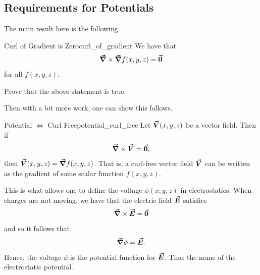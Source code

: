                    	        \subsection{Requirements for Potentials}
                   	        
                   	        The main result here is the following.
                   	        
                   	        \begin{prop}{Curl of Gradient is Zero}{curl_of_gradient}
                   	        We have that
                   	        \[
                   	        \boldsymbol{\vec{\nabla}} \times \boldsymbol{\vec{\nabla}} f(x,y,z) = \boldsymbol{\vec{0}}
                   	        \]
                   	        for all $f(x,y,z)$.
                   	        \end{prop}
                   	        
                   	        \begin{exercise}
                   	        	Prove that the above statement is true.
                   	        \end{exercise}
                   	        
                   	        Then with a bit more work, one can show this follows.
                   	        
                   	        \begin{thm}{Potential $\iff$ Curl Free}{potential_curl_free}
                   	        Let $\boldsymbol{\vec{V}}(x,y,z)$ be a vector field.  Then if 
                   	        \[
                   	        \boldsymbol{\vec{\nabla}} \times \boldsymbol{\vec{V}} = \boldsymbol{\vec{0}},
                   	        \]
                   	        then $\boldsymbol{\vec{V}}(x,y,z) = \boldsymbol{\vec{\nabla}} f(x,y,z)$.  That is, a curl-free vector field $\boldsymbol{\vec{V}}$ can be written as the gradient of some scalar function $f(x,y,z)$.  
                   	        \end{thm}
                   	        
                   	        This is what allows one to define the voltage $\phi(x,y,z)$ in electrostatics.  When charges are not moving, we have that the electric field $\boldsymbol{\vec{E}}$ satisfies
                   	        \[
                   	        \boldsymbol{\vec{\nabla}} \times \boldsymbol{\vec{E}} = \boldsymbol{\vec{0}}
                   	        \]
                   	        and so it follows that
                   	        \[
                   	        \boldsymbol{\vec{\nabla}} \phi= \boldsymbol{\vec{E}}.
                   	        \]
                   	        Hence, the voltage $\phi$ is the potential function for $\boldsymbol{\vec{E}}$. Thus the name of the electrostatic potential.
                   	        
